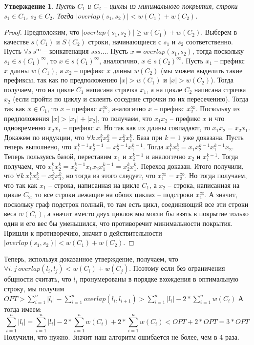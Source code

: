 \documentclass{article}
\newtheorem*{theorem}{Утверждение}
\begin{document}
\begin{theorem}
Пусть $C_1$ и $C_2$ -- циклы из минимального покрытия, строки $s_1 \in C_1$, $s_2 \in C_2$.
Тогда $|overlap(s_1,s_2)| < w(C_1) + w(C_2)$.
\end{theorem}
\begin{proof}
Предположим, что $|overlap(s_1,s_2)| \geq w(C_1) + w(C_2)$. Выберем в качестве $s(C_1)$ и $S(C_2)$ строки, начинающиеся с $s_1$ и $s_2$ соответственно. Пусть $\forall s \ s^{\infty}$ -- конкатенация $sss\ldots$. Пусть $x = overlap(s_1,s_2)$, тогда поскольку $s_1 \in s(C_1)^{\infty}$, то 
$x \in s(C_1)^{\infty}$, аналогично, $x \in s(C_2)^{\infty}$. Пусть $x_1$ -- префикс $x$ длины $w(C_1)$, а $x_2$ -- префикс  $x$ длины $w(C_2)$ (мы можем выделить такие префиксы, так как по предположению $|x| > w(C_1)$ и $|x|> w(C_2)$). Тогда получаем, что на цикле $C_1$ написана строчка $x_1$, а на цикле $C_2$ написана строчка $x_2$ (если пройти по циклу и склеить соседние строчки по их пересечению). Тогда так как $x \in C_1$, то $x$ -- префикс $x_1^{\infty}$, аналогично $x$ -- префикс $x_2^{\infty}$. Поскольку из предположения $|x| > |x_1| + |x_2|$, то получаем, что $x_1x_2$ -- префикс $x$ и что одновременно $x_2x_1$ -- префикс $x$. Но так как их длины совпадают, то $x_1x_2 = x_2x_1$.
Докажем по индукции, что $\forall k\ x_1^k x_2^k = x_2^k x_1^k$. База при $k=1$ уже доказана. Пусть теперь выполнено, что $x_1^{k-1}x_2^{k-1} =x_2^{k-1}x_1^{k-1}$. Тогда $x_1^kx_2^k=x_1x_2^{k-1}x_1^{k-1}x_2$. Теперь пользуясь базой, переставим $x_1$ и $x_2^{k-1}$ и аналогично $x_2$ и $x_1^{k-1}$. Тогда получаем, что $x_1^kx_2^k=x_2^{k-1}x_1x_2x_1^{k-1}=x_2^kx_1^k$. Переход доказан. Итого получили, что $\forall k\ x_1^k x_2^k = x_2^k x_1^k$, но тогда из этого следует, что $x_1^{\infty} = x_2^{\infty}$. Но тогда получаем, что так как $x_1$ -- строка, написанная на цикле $C_1$, а $x_2$ -- строка, написанная на цикле $C_2$, то все строки лежащие на обоих циклах -- подстроки $x_1^{\infty}$. А значит, поскольку граф подстрок полный, то там есть цикл, соединяющий все эти строки веса $w(C_1)$, а значит вместо двух циклов мы могли бы взять в покрытие только один и его вес бы уменьшился, что противоречит минимальности покрытия. Пришли к противоречию, значит в действительности 
$|overlap(s_1,s_2)| < w(C_1) + w(C_2)$.
\end{proof}

Теперь, используя доказанное утверждение, получаем, что $\forall i,j\ overlap(l_i,l_j) < w(C_i)+w(C_j)$.
Поэтому если без ограничения общности считать, что $l_i$ пронумерованы в порядке вхождения в оптимальную строку, мы получим  $OPT > \sum_{i=1}^n |l_i| - \sum_{i=1}^n overlap(l_i,l_{i+1}) > \sum_{i=1}^n |l_i| - 2*\sum_{i=1}^n w(C_i)$ А тогда имеем:
$$\sum_{i=1}^n |l_i| = \sum_{i=1}^n |l_i| - 2*\sum_{i=1}^n w(C_i) + 2*\sum_{i=1}^n w(C_i) < OPT + 2*OPT = 3*OPT$$
Получили, что нужно. Значит наш алгоритм ошибается не более, чем в 4 раза.
\end{document}
